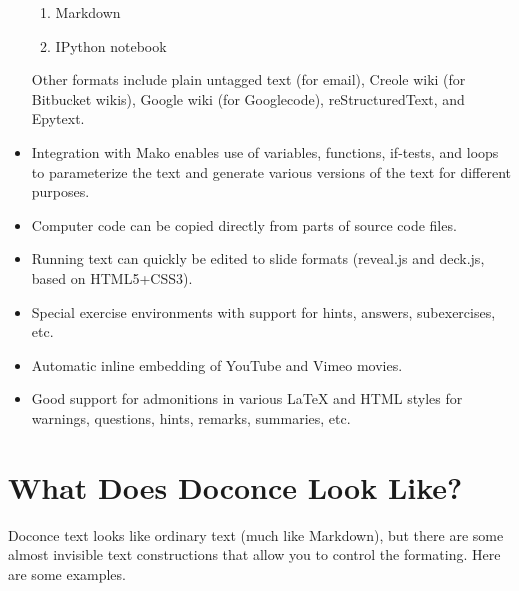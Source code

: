 \documentclass[%
oneside,                 %
final,                   %
10pt]{article}
\begin{document}
\begin{itemize}
\begin{enumerate}
  \item Markdown

  \item IPython notebook
\end{enumerate}

\noindent
   Other formats include plain untagged text (for email),
   Creole wiki (for Bitbucket wikis), Google wiki (for Googlecode),
   reStructuredText, and Epytext.

 \item Integration with Mako enables use of variables, functions, if-tests,
   and loops to parameterize the text and generate various versions of
   the text for different purposes.

 \item Computer code can be copied directly from parts of source code files.

 \item Running text can quickly be edited to slide formats (reveal.js and deck.js,
   based on HTML5+CSS3).

 \item Special exercise environments with support for hints, answers,
   subexercises, etc.

 \item Automatic inline embedding of YouTube and Vimeo movies.

 \item Good support for admonitions in various {\LaTeX} and HTML styles
   for warnings, questions, hints, remarks, summaries, etc.
\end{itemize}

\noindent
\section{What Does Doconce Look Like?}

Doconce text looks like ordinary text (much like Markdown), but there
are some almost invisible text constructions that allow you to control
the formating. Here are some examples.
\end{document}
